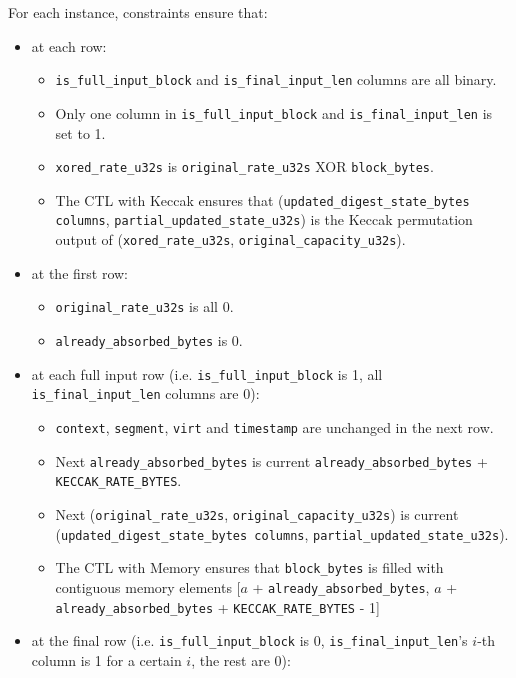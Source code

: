 For each instance, constraints ensure that:
\begin{itemize}
    \item at each row:
    \begin{itemize}
        \item \texttt{is\_full\_input\_block} and \texttt{is\_final\_input\_len} columns are all binary.
        \item Only one column in \texttt{is\_full\_input\_block} and \texttt{is\_final\_input\_len} is set to 1.
        \item \texttt{xored\_rate\_u32s} is \texttt{original\_rate\_u32s} XOR \texttt{block\_bytes}.
        \item The CTL with Keccak ensures that (\texttt{updated\_digest\_state\_bytes columns}, \texttt{partial\_updated\_state\_u32s}) is the Keccak permutation output of (\texttt{xored\_rate\_u32s}, \texttt{original\_capacity\_u32s}).
    \end{itemize}
    \item at the first row:
    \begin{itemize}
        \item \texttt{original\_rate\_u32s} is all 0.
        \item \texttt{already\_absorbed\_bytes} is 0.
    \end{itemize}
    \item at each full input row (i.e. \texttt{is\_full\_input\_block} is 1, all \texttt{is\_final\_input\_len} columns are 0):
    \begin{itemize}
        \item \texttt{context}, \texttt{segment}, \texttt{virt} and \texttt{timestamp} are unchanged in the next row.
        \item Next \texttt{already\_absorbed\_bytes} is current \texttt{already\_absorbed\_bytes} + \texttt{KECCAK\_RATE\_BYTES}.
        \item Next (\texttt{original\_rate\_u32s}, \texttt{original\_capacity\_u32s}) is current (\texttt{updated\_digest\_state\_bytes columns}, \texttt{partial\_updated\_state\_u32s}).
        \item The CTL with Memory ensures that \texttt{block\_bytes} is filled with contiguous memory elements [$a$ + \texttt{already\_absorbed\_bytes}, $a$ + \texttt{already\_absorbed\_bytes} + \texttt{KECCAK\_RATE\_BYTES} - 1]
    \end{itemize}
    \item at the final row (i.e. \texttt{is\_full\_input\_block} is 0, \texttt{is\_final\_input\_len}'s $i$-th column is 1 for a certain $i$, the rest are 0):

\end{itemize}
